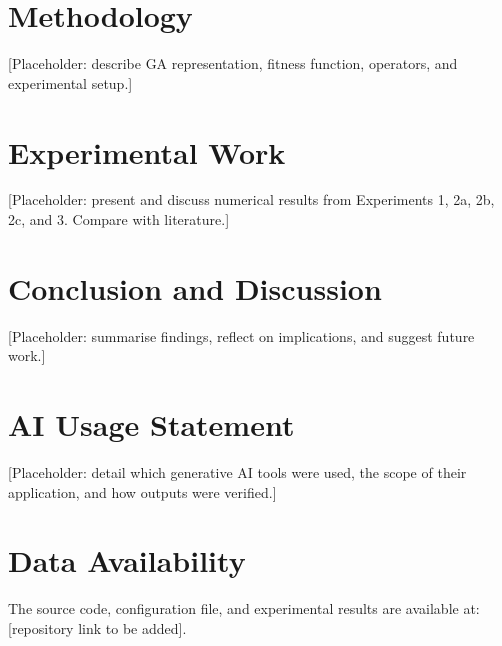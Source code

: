 \documentclass[conference]{IEEEtran}
\begin{document}
\section{Methodology}
[Placeholder: describe GA representation, fitness function,
operators, and experimental setup.]

\section{Experimental Work}
[Placeholder: present and discuss numerical results from
Experiments 1, 2a, 2b, 2c, and 3. Compare with literature.]

\section{Conclusion and Discussion}
[Placeholder: summarise findings, reflect on implications,
and suggest future work.]

\section*{AI Usage Statement}
[Placeholder: detail which generative AI tools were used,
the scope of their application, and how outputs were verified.]

\section*{Data Availability}
The source code, configuration file, and experimental results
are available at: [repository link to be added].
\end{document}
